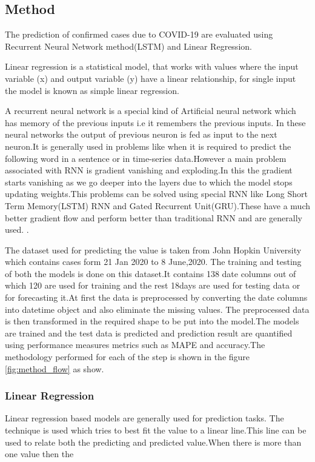 \subsection{Method}

The prediction of confirmed cases due to COVID-19 are evaluated using
Recurrent Neural Network method(LSTM) and Linear Regression.

Linear regression is a statistical model, that works with values where the
input variable (x) and output variable (y) have a linear relationship, for
single input the model is known as simple linear regression.

A recurrent neural network is a special kind of Artificial neural network which
has memory of the previous inputs i.e it remembers the previous inputs. In these neural networks the output of previous neuron is fed as input to the next neuron.It is generally used in problems like when it is required to predict the following word in a sentence or in time-series data.However a main problem associated with RNN is gradient vanishing and exploding.In this the gradient starts vanishing as we go deeper into the layers due to which the model stops updating weights.This problems can be solved using special RNN like Long Short Term Memory(LSTM) RNN and Gated Recurrent Unit(GRU).These have a much better gradient flow and perform better than traditional RNN and are generally used. \cite{bandyopadhyay2020machine}.

The dataset used for predicting the value is taken from John Hopkin University which
contains cases form 21 Jan 2020 to 8 June,2020. The training and testing of both the models
is done on this dataset.It contains 138 date columns out of which 120 are used for training
and the rest 18days are used for testing data or for forecasting it.At first the data is preprocessed by converting the date columns into datetime object and also eliminate the
missing values. The preprocessed data is then transformed in the required shape to be put
into the model.The models are trained and the test data is predicted and prediction result
are quantified using performance measures metrics such as MAPE and
accuracy.The methodology performed for each of the step is shown in the figure
\ref{fig:method_flow} as show.

\subsubsection{Linear Regression}
Linear regression based models are generally used for prediction tasks. The
technique is used which tries to best fit the value to a linear line.This line can be used to
relate both the predicting and predicted value.When there is more than one value then the

